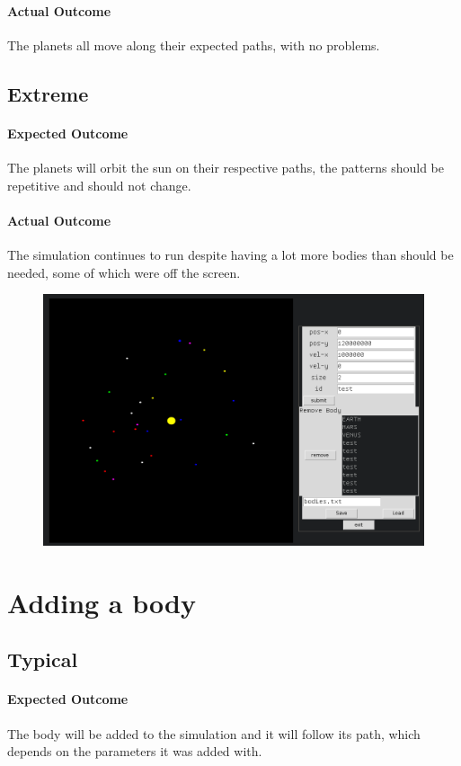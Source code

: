 \paragraph{Actual Outcome}
The planets all move along their expected paths, with no problems.

\subsection{Extreme}
\paragraph{Expected Outcome}
The planets will orbit the sun on their respective paths, the patterns should be
repetitive and should not change.
\paragraph{Actual Outcome}
The simulation continues to run despite having a lot more bodies than should be
needed, some of which were off the screen.
\begin{figure}[h!]
	\includegraphics[width=\textwidth]{./img/run.png}
\end{figure}


\section{Adding a body}
\subsection{Typical}
\paragraph{Expected Outcome}
The body will be added to the simulation and it will follow its path, which
depends on the parameters it was added with.
